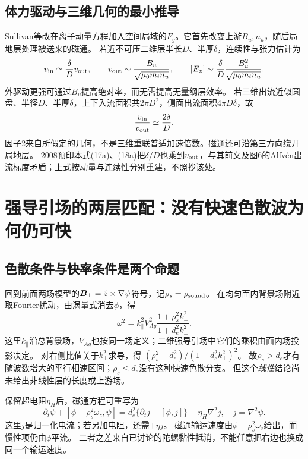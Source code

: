 \subsection{体力驱动与三维几何的最小推导}
Sullivan等改在离子动量方程加入空间局域的$F_y$。它首先改变上游$B_u,n_u$，随后局地层处理被送来的磁通。
若近不可压二维层半长$D$、半厚$\delta$，连续性与张力估计为
\begin{equation}
 v_{\rm in}\simeq\frac\delta D v_{\rm out},\qquad
 v_{\rm out}\sim\frac{B_u}{\sqrt{\mu_0m_in_u}},\qquad
 |E_z|\sim\frac\delta D\frac{B_u^2}{\sqrt{\mu_0m_in_u}}.
\end{equation}
外驱动更强可通过$B_u$提高绝对率，而无需提高无量纲层效率。
若三维出流近似圆盘、半径$D$、半厚$\delta$，上下入流面积共$2\pi D^2$，侧面出流面积$4\pi D\delta$，故
\begin{equation}
 \frac{v_{\rm in}}{v_{\rm out}}\simeq\frac{2\delta}{D}.
\end{equation}
因子2来自所假定的几何，不是三维重联普适加速倍数。磁通还可沿第三方向绕开局地层。
2008预印本式(17a)、(18a)把$\delta/D$也乘到$v_{\rm out}$，与其前文及图6的Alfvén出流标度矛盾；上式按动量与连续性分别重建，不照抄该处。\citep{L076,F717}

\section{强导引场的两层匹配：没有快速色散波为何仍可快}
\subsection{色散条件与快率条件是两个命题}
回到前面两场模型的$\bm{B}_\perp=\hat z\times\nabla\psi$符号，记$\rho_s=\rho_{\rm sound}$。
在均匀面内背景场附近取Fourier扰动，由涡量式消去$\phi$，得
\begin{equation}
 \omega^2=k_\parallel^2 V_{Ag}^2
 \frac{1+\rho_s^2k_\perp^2}{1+d_e^2k_\perp^2}.
 \label{eq:guide_dispersion}
\end{equation}
这里$k_\parallel$沿总背景场，$V_{Ag}$也按同一场定义；二维强导引场中它们的乘积由面内场投影决定。
对右侧比值关于$k_\perp^2$求导，得
$(\rho_s^2-d_e^2)/(1+d_e^2k_\perp^2)^2$。
故$\rho_s>d_e$才有随波数增大的平行相速区间；$\rho_s\le d_e$没有这种快速色散分支。
但这个\emph{线性}结论尚未给出非线性层的长度或上游场。\citep{L216,L217}

保留超电阻$\eta_H$后，磁通方程可重写为
\begin{equation}
 \partial_t\psi+[\phi-\rho_s^2\omega_z,\psi]
 =d_e^2\{\partial_tj+[\phi,j]\}-\eta_H\nabla^2j,
 \quad j=\nabla^2\psi.
\end{equation}
这里$j$是归一化电流；若另加电阻，还需$+\eta j$。
磁通输运速度由$\phi-\rho_s^2\omega_z$给出，而惯性项仍由$\phi$平流。
二者之差来自已讨论的陀螺黏性抵消，不能任意把右边也换成同一个输运速度。

